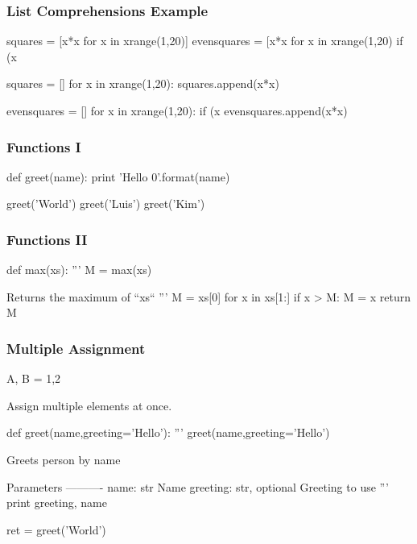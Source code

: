 \begin{frame}[fragile]
\frametitle{List Comprehensions Example}

\begin{python}
squares = [x*x for x in xrange(1,20)]
evensquares = [x*x for x in xrange(1,20) if (x%
\end{python}

\begin{python}
squares = []
for x in xrange(1,20):
    squares.append(x*x)

evensquares = []
for x in xrange(1,20):
    if (x%
        evensquares.append(x*x)
\end{python}

\end{frame}

\begin{frame}[fragile]
\frametitle{Functions I}

\begin{python}
def greet(name):
    print 'Hello {0}'.format(name)

greet('World')
greet('Luis')
greet('Kim')
\end{python}
\end{frame}

\begin{frame}[fragile]
\frametitle{Functions II}

\begin{python}
def max(xs):
    '''
    M = max(xs)

    Returns the maximum of ``xs``
    '''
    M = xs[0]
    for x in xs[1:]
        if x > M:
            M = x
    return M
\end{python}

\end{frame}


\begin{frame}[fragile]
\frametitle{Multiple Assignment}

\begin{python}
A, B = 1,2
\end{python}

Assign multiple elements at once.
\end{frame}

\begin{frame}[fragile]

\begin{python}
def greet(name,greeting='Hello'):
    '''
    greet(name,greeting='Hello')

    Greets person by name

    Parameters
    ----------
    name: str
        Name
    greeting: str, optional
        Greeting to use
    '''
    print greeting, name

ret = greet('World')

\end{python}

\end{frame}

